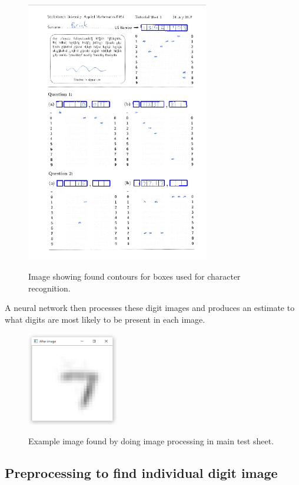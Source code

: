 \begin{figure}
  \centering
  \includegraphics[width=8cm]{DigitScan}\\
  \caption{Image showing found contours for boxes used for character recognition.}
  \label{fig:sa}
\end{figure}

A neural network then processes these digit images and produces an estimate to what digits are most likely to be present in each image.

\begin{figure}
  \centering
  \includegraphics[width=4cm]{TranslateAndScale}\\
  \caption{Example image found by doing image processing in main test sheet.}
  \label{fig:example}
\end{figure}

\subsection{Preprocessing to find individual digit image}
\label{sec:preprocess}

